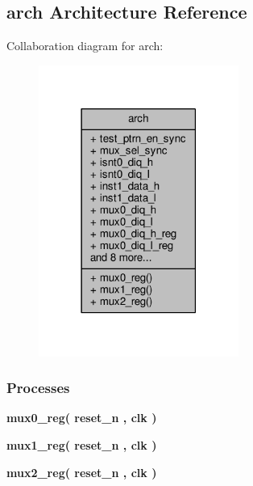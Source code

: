 \subsection{arch Architecture Reference}
\label{classtxiqmux_1_1arch}


Collaboration diagram for arch\+:\nopagebreak
\begin{figure}[H]
\begin{center}
\leavevmode
\includegraphics[width=186pt]{d7/d6c/classtxiqmux_1_1arch__coll__graph}
\end{center}
\end{figure}
\subsubsection*{Processes}
 \begin{DoxyCompactItemize}
\item 
{\bf mux0\+\_\+reg}{\bfseries  ( {\bfseries {\bfseries {\bf reset\+\_\+n}} \textcolor{vhdlchar}{ }} , {\bfseries {\bfseries {\bf clk}} \textcolor{vhdlchar}{ }} )}
\item 
{\bf mux1\+\_\+reg}{\bfseries  ( {\bfseries {\bfseries {\bf reset\+\_\+n}} \textcolor{vhdlchar}{ }} , {\bfseries {\bfseries {\bf clk}} \textcolor{vhdlchar}{ }} )}
\item 
{\bf mux2\+\_\+reg}{\bfseries  ( {\bfseries {\bfseries {\bf reset\+\_\+n}} \textcolor{vhdlchar}{ }} , {\bfseries {\bfseries {\bf clk}} \textcolor{vhdlchar}{ }} )}
\end{DoxyCompactItemize}
